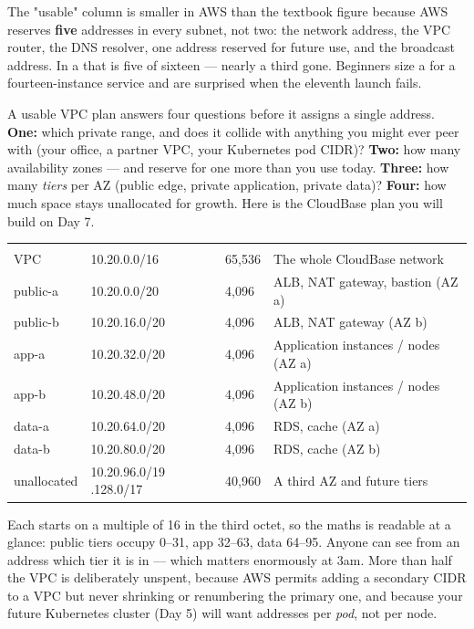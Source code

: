 \begin{infranote}
The "usable" column is smaller in AWS than the textbook figure because AWS reserves \textbf{five} addresses in every subnet, not two: the network address, the VPC router, the DNS resolver, one address reserved for future use, and the broadcast address. In a  that is five of sixteen --- nearly a third gone. Beginners size a  for a fourteen-instance service and are surprised when the eleventh launch fails.
\end{infranote}

 A usable VPC plan answers four questions before it assigns a single address. \textbf{One:} which private range, and does it collide with anything you might ever peer with (your office, a partner VPC, your Kubernetes pod CIDR)? \textbf{Two:} how many availability zones --- and reserve for one more than you use today. \textbf{Three:} how many \emph{tiers} per AZ (public edge, private application, private data)? \textbf{Four:} how much space stays unallocated for growth. Here is the CloudBase plan you will build on Day 7.

\begin{center}\small
\wbrowcolors
\begin{tabularx}{\linewidth}{@{}L{22mm} L{24mm} C{16mm} X@{}}
 &  &  & \\
VPC & 10.20.0.0/16 & 65{,}536 & The whole CloudBase network\\
public-a & 10.20.0.0/20 & 4{,}096 & ALB, NAT gateway, bastion (AZ a)\\
public-b & 10.20.16.0/20 & 4{,}096 & ALB, NAT gateway (AZ b)\\
app-a & 10.20.32.0/20 & 4{,}096 & Application instances / nodes (AZ a)\\
app-b & 10.20.48.0/20 & 4{,}096 & Application instances / nodes (AZ b)\\
data-a & 10.20.64.0/20 & 4{,}096 & RDS, cache (AZ a)\\
data-b & 10.20.80.0/20 & 4{,}096 & RDS, cache (AZ b)\\
unallocated & 10.20.96.0/19 .128.0/17 & 40{,}960 & A third AZ and future tiers\\
\end{tabularx}
\end{center}

 Each  starts on a multiple of 16 in the third octet, so the maths is readable at a glance: public tiers occupy 0--31, app 32--63, data 64--95. Anyone can see from an address which tier it is in --- which matters enormously at 3am. More than half the VPC is deliberately unspent, because AWS permits adding a secondary CIDR to a VPC but never shrinking or renumbering the primary one, and because your future Kubernetes cluster (Day 5) will want addresses per \emph{pod}, not per node.

